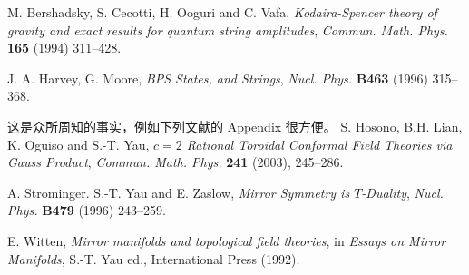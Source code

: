 \begin{reflist}
  \item[{[1]}] M. Bershadsky, S. Cecotti, H. Ooguri and C. Vafa,
    \textit{Kodaira-Spencer theory of gravity and exact results for quantum string amplitudes},
    \textit{Commun. Math. Phys.} \textbf{165} (1994) 311--428.
  \item[{[2]}] J. A. Harvey, G. Moore,
    \textit{BPS States, and Strings},
    \textit{Nucl. Phys.} \textbf{B463} (1996) 315--368.
  \item[{[3]}] 这是众所周知的事实，例如下列文献的 Appendix 很方便。
    S. Hosono, B.H. Lian, K. Oguiso and S.-T. Yau,
    \textit{$c=2$ Rational Toroidal Conformal Field Theories via Gauss Product},
    \textit{Commun. Math. Phys.} \textbf{241} (2003), 245--286.
  \item[{[4]}] A. Strominger. S.-T. Yau and E. Zaslow,
    \textit{Mirror Symmetry is $T$-Duality},
    \textit{Nucl. Phys.} \textbf{B479} (1996) 243--259.
  \item[{[5]}] E. Witten,
    \textit{Mirror manifolds and topological field theories},
    in \textit{Essays on Mirror Manifolds}, S.-T. Yau ed., International Press (1992).
\end{reflist}


\renewcommand{\thesection}{\Roman{section}}

